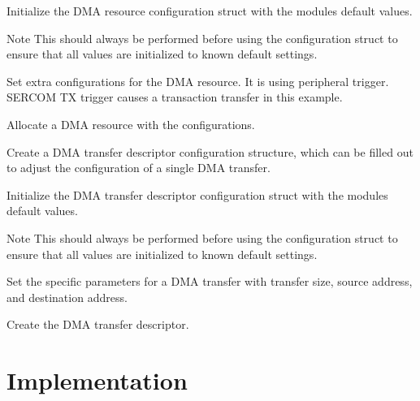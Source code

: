 \begin{DoxyEnumerate}
\begin{DoxyEnumerate}
\item Initialize the D\+MA resource configuration struct with the module\textquotesingle{}s default values. 
\begin{DoxyCodeInclude}{0}
\end{DoxyCodeInclude}
 \begin{DoxyNote}{Note}
This should always be performed before using the configuration struct to ensure that all values are initialized to known default settings.
\end{DoxyNote}

\item Set extra configurations for the D\+MA resource. It is using peripheral trigger. S\+E\+R\+C\+OM TX trigger causes a transaction transfer in this example. 
\begin{DoxyCodeInclude}{0}
\end{DoxyCodeInclude}

\item Allocate a D\+MA resource with the configurations. 
\begin{DoxyCodeInclude}{0}
\end{DoxyCodeInclude}

\item Create a D\+MA transfer descriptor configuration structure, which can be filled out to adjust the configuration of a single D\+MA transfer. 
\begin{DoxyCodeInclude}{0}
\end{DoxyCodeInclude}

\item Initialize the D\+MA transfer descriptor configuration struct with the module\textquotesingle{}s default values. 
\begin{DoxyCodeInclude}{0}
\end{DoxyCodeInclude}
 \begin{DoxyNote}{Note}
This should always be performed before using the configuration struct to ensure that all values are initialized to known default settings.
\end{DoxyNote}

\item Set the specific parameters for a D\+MA transfer with transfer size, source address, and destination address. 
\begin{DoxyCodeInclude}{0}
\end{DoxyCodeInclude}

\item Create the D\+MA transfer descriptor. 
\begin{DoxyCodeInclude}{0}
\end{DoxyCodeInclude}
 
\end{DoxyEnumerate}
\end{DoxyEnumerate}\hypertarget{asfdoc_sam0_sercom_i2c_master_dma_use_case_asfdoc_sam0_sercom_i2c_master_dma_use_implemenation}{}\section{Implementation}\label{asfdoc_sam0_sercom_i2c_master_dma_use_case_asfdoc_sam0_sercom_i2c_master_dma_use_implemenation}
